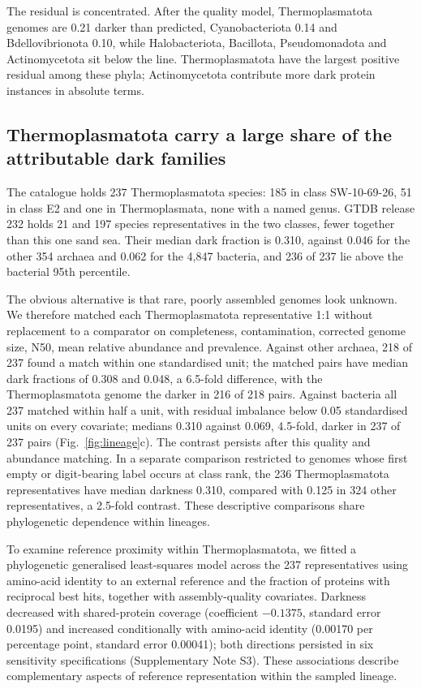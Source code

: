 \documentclass[11pt]{article}
\begin{document}
The residual is concentrated. After the quality model, Thermoplasmatota genomes are 0.21 darker than
predicted, Cyanobacteriota 0.14 and Bdellovibrionota 0.10, while Halobacteriota, Bacillota,
Pseudomonadota and Actinomycetota sit below the line. Thermoplasmatota have the largest positive residual among these phyla; Actinomycetota contribute more dark protein instances in absolute terms.

\subsection*{Thermoplasmatota carry a large share of the attributable dark families}

The catalogue holds 237 Thermoplasmatota species: 185 in class SW-10-69-26, 51 in class E2 and one
in Thermoplasmata, none with a named genus. GTDB release 232 holds 21 and 197 species
representatives in the two classes, fewer together than this one sand sea. Their median dark
fraction is 0.310, against 0.046 for the other 354 archaea and 0.062 for the 4{,}847 bacteria, and
236 of 237 lie above the bacterial 95th percentile.

The obvious alternative is that rare, poorly assembled genomes look unknown. We therefore matched
each Thermoplasmatota representative 1:1 without replacement to a comparator on completeness,
contamination, corrected genome size, N50, mean relative abundance and prevalence. Against other
archaea, 218 of 237 found a match within one standardised unit; the matched pairs have median dark
fractions of 0.308 and 0.048, a 6.5-fold difference, with the Thermoplasmatota genome the darker in
216 of 218 pairs. Against bacteria all 237 matched within half a unit, with residual imbalance below
0.05 standardised units on every covariate; medians 0.310 against 0.069, 4.5-fold, darker in 237 of
237 pairs (Fig.~\ref{fig:lineage}c). The contrast persists after this quality and abundance matching. In a separate comparison
restricted to genomes whose first empty or digit-bearing label occurs at class rank, the 236
Thermoplasmatota representatives have median darkness 0.310, compared with 0.125 in 324 other
representatives, a 2.5-fold contrast. These descriptive comparisons share phylogenetic dependence
within lineages.

To examine reference proximity within Thermoplasmatota, we fitted a phylogenetic generalised
least-squares model across the 237 representatives using amino-acid identity to an external
reference and the fraction of proteins with reciprocal best hits, together with assembly-quality
covariates. Darkness decreased with shared-protein coverage (coefficient $-0.1375$, standard
error 0.0195) and increased conditionally with amino-acid identity (0.00170 per percentage point,
standard error 0.00041); both directions persisted in six sensitivity specifications
(Supplementary Note S3). These associations describe complementary aspects of reference
representation within the sampled lineage.
\end{document}
